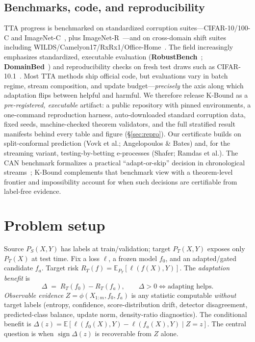 \documentclass[conference]{IEEEtran}
\theoremstyle{plain}
\theoremstyle{definition}
\newcommand{\E}{\mathbb{E}}
\newcommand{\sign}{\operatorname{sign}}
\begin{document}
\subsection{Benchmarks, code, and reproducibility}
TTA progress is benchmarked on standardized corruption suites---CIFAR-10/100-C and
ImageNet-C~\cite{hendrycks2019cifar10c}, plus ImageNet-R~\cite{hendrycks2021manyfaces}---and on
cross-domain shift suites including WILDS/Camelyon17/RxRx1/Office-Home~\cite{koh2021wilds,bandi2019camelyon,taylor2019rxrx1,venkateswara2017officehome}.
The field increasingly emphasizes standardized, executable evaluation
(\textbf{RobustBench}~\cite{croce2021robustbench}; \textbf{DomainBed}~\cite{gulrajani2021domainbed}) and
reproducibility checks on fresh test draws such as CIFAR-10.1~\cite{recht2019cifar10}. Most TTA
methods ship official code, but evaluations vary in batch regime, stream composition, and update
budget---\emph{precisely} the axis along which adaptation flips between helpful and harmful. We
therefore release K-Bound as a \emph{pre-registered, executable} artifact: a public repository
with pinned environments, a one-command reproduction harness, auto-downloaded standard corruption
data, fixed seeds, machine-checked theorem validators, and the full stratified result manifests
behind every table and figure (\S\ref{sec:repro}). Our certificate builds on split-conformal
prediction (Vovk et al.; Angelopoulos \& Bates) and, for the streaming variant, testing-by-betting
e-processes (Shafer; Ramdas et al.). The CAN benchmark formalizes a practical ``adapt-or-skip''
decision in chronological streams~\cite{jeon2025can}; K-Bound complements that benchmark view with
a theorem-level frontier and impossibility account for when such decisions are certifiable from
label-free evidence.

\section{Problem setup}\label{sec:setup}
Source $P_S(X,Y)$ has labels at train/validation; target $P_T(X,Y)$ exposes only
$P_T(X)$ at test time. Fix a loss $\ell$, a frozen model $f_0$, and an
adapted/gated candidate $f_a$. Target risk $R_T(f)=\E_{P_T}[\ell(f(X),Y)]$.
The \emph{adaptation benefit} is
\begin{equation}
\Delta \;=\; R_T(f_0)-R_T(f_a),\qquad \Delta>0 \iff \text{adapting helps.}
\end{equation}
\emph{Observable evidence} $Z=\phi(X_{1:m},f_0,f_a)$ is any statistic computable
\emph{without} target labels (entropy, confidence, score-distribution drift,
detector disagreement, predicted-class balance, update norm, density-ratio
diagnostics). The conditional benefit is $\Delta(z)=\E[\ell(f_0(X),Y)-\ell(f_a(X),Y)\mid Z=z]$.
The central question is when $\sign\Delta(z)$ is recoverable from $Z$ alone.
\end{document}
